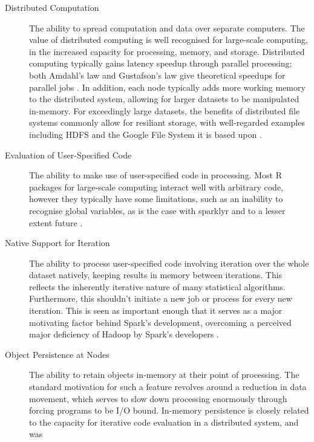\documentclass[a4paper,10pt]{article}
\begin{document}
\begin{description}
\item[Distributed Computation]
      The ability to spread computation and data over separate computers.
      The value of distributed computing is well recognised for
      large-scale computing, in the increased capacity for
      processing, memory, and storage.
      Distributed computing typically gains latency speedup through
      parallel processing; both Amdahl's law and Gustafson's law give
      theoretical speedups for parallel jobs \cite{amdahl1967law}
      \cite{gustafson1988law}.
      In addition, each node typically adds more working memory to
      the distributed system, allowing for larger datasets to be
      manipulated in-memory.
      For exceedingly large datasets, the benefits of distributed
      file systems commonly allow for resiliant storage, with
      well-regarded examples including HDFS and the Google File
      System it is based upon \cite{shvachko2010hadoop}
      \cite{ghemawat2003google}.
\item[Evaluation of User-Specified Code]
      The ability to make use of user-specified code in processing.
	Most R packages for large-scale computing interact well with
	arbitrary code, however they typically have some limitations,
	such as an inability to recognise global variables, as is the
	case with sparklyr and to a lesser extent future
      \cite{sparklyr2020limitations} \cite{microsoft20}.
\item[Native Support for Iteration]
      The ability to process user-specified code involving iteration
      over the whole dataset natively, keeping results in
      memory between iterations.
      This reflects the inherently iterative nature of many
      statistical algorithms.
      Furthermore, this shouldn't initiate a new job or process for
      every new iteration.
      This is seen as important enough that it serves as a major
	motivating factor behind Spark's development, overcoming a
	perceived major deficiency of Hadoop by Spark's developers
	\cite{zaharia2010spark}.
\item[Object Persistence at Nodes]
      The ability to retain objects in-memory at their point of
      processing.
      The standard motivation for such a feature revolves around a
      reduction in data movement, which serves to slow down
      processing enormously through forcing programs to be I/O bound.
      In-memory persistence is closely related to the capacity for
      iterative code evaluation in a distributed system, and was

\end{description}
\end{document}
